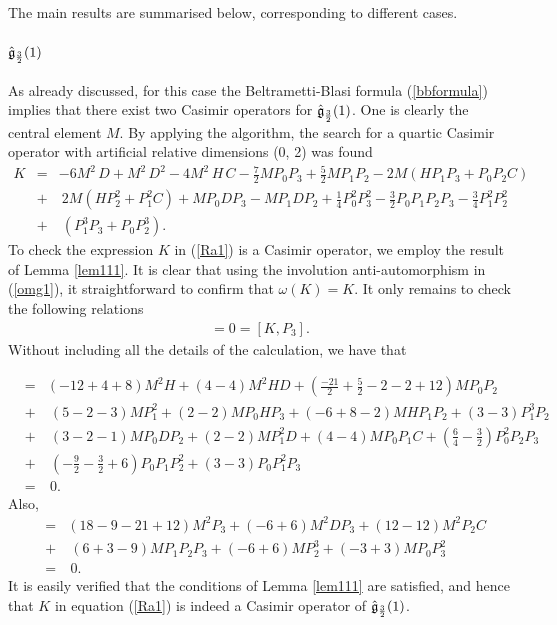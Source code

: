 \documentclass[12pt]{article}
\begin{document}
The main results are summarised below, corresponding to different cases.

\subsubsection{$\mathfrak{\Hat{g}}_\frac{3}{2}(1)$ }\label{3/2} 

As already discussed, for this case the Beltrametti-Blasi formula
(\ref{bbformula}) implies that there exist two Casimir
operators for $\mathfrak{\Hat{g}}_\frac{3}{2}(1)$. One is clearly the central
element $M$. By applying the algorithm, the search for a quartic Casimir
operator with artificial relative dimensions (0, 2) was found
\begin{eqnarray}
K&=& -6 M^2 \,D +  M^2 \,D^{2} -4 M^2\, H\, C-\frac{7}{2} MP_{0}P_{3}
+ \frac{5}{2} MP_{1}P_{2}- 2M ( H P_{1}P_{3}+  P_{0}P_{2}C )  \nonumber\\
&+&\ 2 M( H P^{2}_{2}+ P^{2}_{1}C ) 
+   M  P_{0}DP_{3}
-M  P_{1}DP_{2}+ \frac{1}{4} P^{2}_{0}P^{2}_{3}-\frac{3}{2}P_{0}P_{1}
P_{2}P_{3}  - \frac{3}{4} P^{2}_{1}P^{2}_{2}\nonumber\\
&+&\  ( P^{3}_{1}P_{3}+  P_{0}P^{3}_{2}).\label{Ra1} 
\end{eqnarray} 
To check the expression $K$ in (\ref{Ra1}) is a Casimir operator, we employ the result of Lemma \ref{lem111}. It is clear that using the involution anti-automorphism in (\ref{omg1}), it straightforward to confirm that $\omega(K)=K$. It only remains to check the following relations  
\begin{eqnarray*}
 [K, H]=0=[K,P_ {3}].\label{Ra3} 
\end{eqnarray*}
Without including all the details of the calculation, we have that

\begin{eqnarray*}
[K,H]&=&   ( {-12+ 4  + 8}) {M^2H} +( {4-4 }) {M^2HD} + {(\frac{-21}{2}+\frac{5}{2}-2-2+12 )} {M P_{0}P_{2}} 
 \nonumber\\
&+&\   {( 5 - 2  -3 )}  {M P^2_{1}} +   {(2-2 )}  {MP_{0}H P_{3}}  +  {(-6+8-2 )}  {MH P_{1}P_{2}} + {(3- 3  )} {P^3_{1}P_{2}} 
\nonumber\\
&+&\   {(3-2-1 )}  {M P_{0}DP_{2}}  + {(2-2 )} {M P^2_{1}D }  +  {(4-4 )} {M P_{0}P_{1}C}+ {(\frac{6}{4} -\frac{3}{2}  )} {P^2_{0}P_{2}P_{3}}
 \nonumber\\
 &+&\  {(-\frac{9}{2}- \frac{3}{2}+6  )}  { P_{0}P_{1}P^2_{2}}  + {(3- 3  )}{P_{0}P^2_{1}P_{3}}  \nonumber\\
 &=&\  0.\label{Ra4} 
\end{eqnarray*}
Also, 
\begin{eqnarray*}
[K,P_ {3}]&=&( 18-9 -21+12) M^2 P_{3} + ( -6 +6 )  M^2 DP_{3}+  ( 12-12 )    M^2 P_{2}C  \nonumber \\
 &+&\  (6 +3 -9 )    M P_{1}P_{2} P_{3}+( -6 +6  )  M P^3_{2}+ (-3 +3 )  M P_{0}P^2_{3}\nonumber\\
 &=&\  0. 
\end{eqnarray*}
It is easily verified that the conditions of Lemma \ref{lem111} are satisfied,
and hence that  $K$ in equation (\ref{Ra1}) is indeed a Casimir operator of
$\mathfrak{\Hat{g}}_\frac{3}{2}(1)$.  
\end{document}
